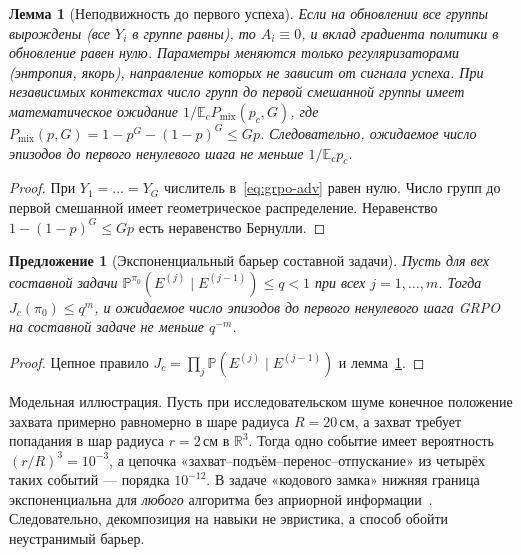 \documentclass[11pt,a4paper]{article}
\theoremstyle{plain}
\newtheorem{lemma}[theorem]{Лемма}
\newtheorem{proposition}[theorem]{Предложение}
\theoremstyle{definition}
\theoremstyle{remark}
\newcommand{\E}{\mathbb{E}}
\newcommand{\PP}{\mathbb{P}}
\newcommand{\R}{\mathbb{R}}
\newcommand{\Pmix}{P_{\mathrm{mix}}}
\begin{document}
\begin{lemma}[Неподвижность до первого успеха]\label{lem:stationary}
Если на обновлении все группы вырождены (все $Y_i$ в группе равны), то $A_i\equiv0$, и вклад градиента политики в обновление равен нулю. Параметры меняются только регуляризаторами (энтропия, якорь), направление которых не зависит от сигнала успеха. При независимых контекстах число групп до первой смешанной группы имеет математическое ожидание $1/\E_c\Pmix(p_c,G)$, где $\Pmix(p,G)=1-p^G-(1-p)^G\le Gp$. Следовательно, ожидаемое число \emph{эпизодов} до первого ненулевого шага не меньше $1/\E_cp_c$.
\end{lemma}
\begin{proof}
При $Y_1=\dots=Y_G$ числитель в~\eqref{eq:grpo-adv} равен нулю. Число групп до первой смешанной имеет геометрическое распределение. Неравенство $1-(1-p)^G\le Gp$ есть неравенство Бернулли.
\end{proof}

\begin{proposition}[Экспоненциальный барьер составной задачи]\label{prop:barrier}
Пусть для вех составной задачи $\PP^{\pi_0}(E^{(j)}\mid E^{(j-1)})\le q<1$ при всех $j=1,\dots,m$. Тогда $J_c(\pi_0)\le q^m$, и ожидаемое число эпизодов до первого ненулевого шага GRPO на составной задаче не меньше $q^{-m}$.
\end{proposition}
\begin{proof}
Цепное правило $J_c=\prod_j\PP(E^{(j)}\mid E^{(j-1)})$ и лемма~\ref{lem:stationary}.
\end{proof}

Модельная иллюстрация. Пусть при исследовательском шуме конечное положение захвата примерно равномерно в шаре радиуса $R=20$\,см, а захват требует попадания в шар радиуса $r=2$\,см в $\R^3$. Тогда одно событие имеет вероятность $(r/R)^3=10^{-3}$, а цепочка «захват--подъём--перенос--отпускание» из четырёх таких событий --- порядка $10^{-12}$. В задаче «кодового замка» нижняя граница экспоненциальна для \emph{любого} алгоритма без априорной информации~\cite{kakade-thesis}. Следовательно, декомпозиция на навыки не эвристика, а способ обойти неустранимый барьер.
\end{document}
